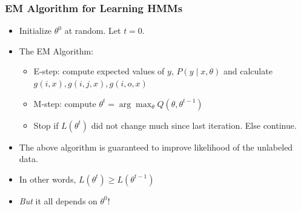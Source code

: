 \begin{frame}
\frametitle{EM Algorithm for Learning HMMs}
\begin{itemize}[<+->]
\item Initialize $\theta^0$ at random. Let $t=0$.
\item The EM Algorithm:
\begin{itemize}[<+->]
\item E-step: compute expected values of $y$, $P(y \mid x, \theta)$ and calculate $g(i,x), g(i,j,x), g(i,o,x)$
\item M-step: compute $\theta^{t} = \arg\max_\theta Q(\theta, \theta^{t-1})$
\item Stop if $L(\theta^t)$ did not change much since last iteration. Else continue.
\end{itemize}
\item The above algorithm is guaranteed to improve likelihood of the unlabeled data.
\item In other words, $L(\theta^t) \geq L(\theta^{t-1})$
\item \emph{But} it all depends on $\theta^0$!
\end{itemize}
\end{frame}





